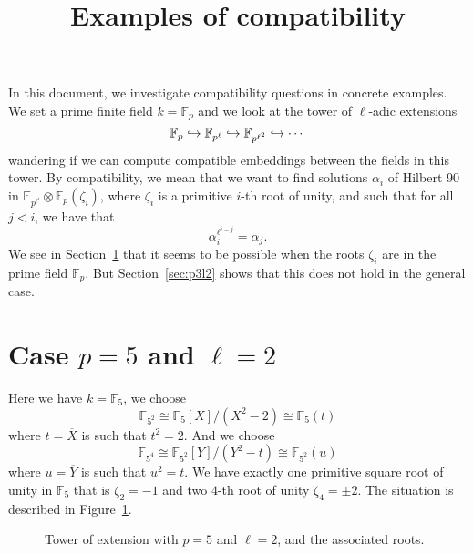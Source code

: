 \documentclass[a4paper,11pt]{article}
\title{Examples of compatibility}
\author{}
\begin{document}
\maketitle





In this document, we investigate compatibility questions in concrete examples.
We set a prime finite field $k=\mathbb{F}_p$ and we look at the tower of
$\ell$-adic extensions 
\[
  \mathbb{F}_p \hookrightarrow \mathbb{F}_{p^\ell} \hookrightarrow \mathbb{F}_{p^{\ell^2}}\hookrightarrow \cdots
\]
wandering if we can compute compatible embeddings between the fields in this
tower. By compatibility, we mean that we want to find solutions $\alpha_i$ of
Hilbert 90 in $\mathbb{F}_{p^{\ell^i}}\otimes\mathbb{F}_p(\zeta_i)$, where
$\zeta_i$ is a primitive $i$-th root of unity, and such that for all $j<i$, we
have that 
\[
  \alpha_i^{\ell^{i-j}}=\alpha_j.
\]
We see in Section~\ref{sec:p5l2} that it seems to be possible when the roots
$\zeta_i$ are in the prime field $\mathbb{F}_p$. But Section~\ref{sec:p3l2}
shows that this does not hold in the general case.

\section{Case $p=5$ and $\ell=2$}
\label{sec:p5l2}

Here we have $k=\mathbb{F}_5$,
we choose
\[
  \mathbb{F}_{5^2}\cong\mathbb{F}_5[X]/(X^2-2)\cong\mathbb{F}_5(t)
\]
where
$t=\overline X$ is such that $t^2=2$. And we choose 
\[
  \mathbb{F}_{5^4}\cong
\mathbb{F}_{5^2}[Y]/(Y^2-t)\cong \mathbb{F}_{5^2}(u)
\]
where $u=\overline
Y$ is such that $u^2 = t$. We have exactly one primitive square root of
unity in $\mathbb{F}_5$ that is $\zeta_2 = -1$ and two $4$-th
root of unity $\zeta_4=\pm 2$. The situation is described in
Figure~\ref{fig:p5l2}.

\begin{figure}
  \centering
{}
\phantom{and}
  \caption{Tower of extension with $p=5$ and $\ell=2$, and the associated roots.}
  \label{fig:p5l2}
\end{figure}
\end{document}
